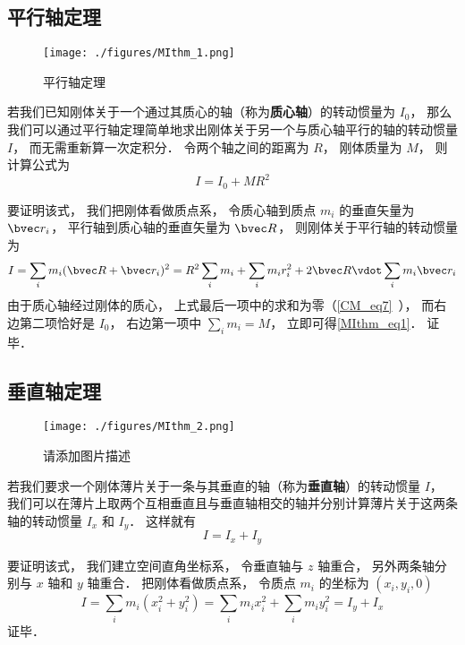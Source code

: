 

\subsection{平行轴定理}
\begin{figure}[ht]
\centering
\texttt{[image: ./figures/MIthm\_1.png]}
\caption{平行轴定理} \label{MIthm_fig1}
\end{figure}

若我们已知刚体关于一个通过其质心的轴（称为\textbf{质心轴}）的转动惯量为 $I_0$， 那么我们可以通过平行轴定理简单地求出刚体关于另一个与质心轴平行的轴的转动惯量 $I$， 而无需重新算一次定积分． 令两个轴之间的距离为 $R$， 刚体质量为 $M$， 则计算公式为%
\begin{equation}\label{MIthm_eq1}
I = I_0 + MR^2
\end{equation}

要证明该式， 我们把刚体看做质点系， 令质心轴到质点 $m_i$ 的垂直矢量为 $\bvec r_i$， 平行轴到质心轴的垂直矢量为 $\bvec R$， 则刚体关于平行轴的转动惯量为
\begin{equation}
I = \sum_i m_i (\bvec R + \bvec r_i)^2 = R^2\sum_i m_i + \sum_i m_i r_i^2 + 2\bvec R \vdot \sum_i m_i \bvec r_i
\end{equation}
由于质心轴经过刚体的质心， 上式最后一项中的求和为零（\autoref{CM_eq7}~）， 而右边第二项恰好是 $I_0$， 右边第一项中 $\sum_i m_i = M$， 立即可得\autoref{MIthm_eq1}． 证毕．


\subsection{垂直轴定理}
\begin{figure}[ht]
\centering
\texttt{[image: ./figures/MIthm\_2.png]}
\caption{请添加图片描述} \label{MIthm_fig2}
\end{figure}
若我们要求一个刚体薄片关于一条与其垂直的轴（称为\textbf{垂直轴}）的转动惯量 $I$， 我们可以在薄片上取两个互相垂直且与垂直轴相交的轴并分别计算薄片关于这两条轴的转动惯量 $I_x$ 和 $I_y$． 这样就有
\begin{equation}\label{MIthm_eq2}
I = I_x + I_y
\end{equation}

要证明该式， 我们建立空间直角坐标系， 令垂直轴与 $z$ 轴重合， 另外两条轴分别与 $x$ 轴和 $y$ 轴重合． 把刚体看做质点系， 令质点 $m_i$ 的坐标为 $(x_i, y_i, 0)$
\begin{equation}
I = \sum_i m_i (x_i^2 + y_i^2) = \sum_i m_i x_i^2 + \sum_i m_i y_i^2 = I_y + I_x
\end{equation}
证毕．